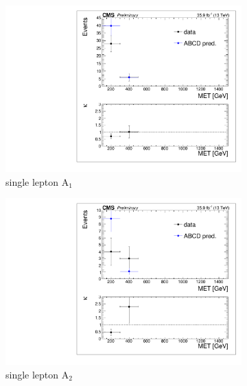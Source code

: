 \begin{figure}[hbp!]
\begin{subfigure}[b]{0.425\textwidth}
\includegraphics[trim={5px 5px 5px 5px},clip,width=\textwidth]{figs/dataClosure_single-tagSR_singleLep.pdf} 
\caption{single lepton A$_{1}$}
\end{subfigure}
\begin{subfigure}[b]{0.425\textwidth}
\includegraphics[trim={5px 5px 5px 5px},clip,width=\textwidth]{figs/dataClosure_double-tagSR_singleLep.pdf} 
\caption{single lepton A$_{2}$}
\end{subfigure}
\vspace{5mm}
\\
\begin{subfigure}[b]{0.425\textwidth}

\end{subfigure}
\end{figure}
